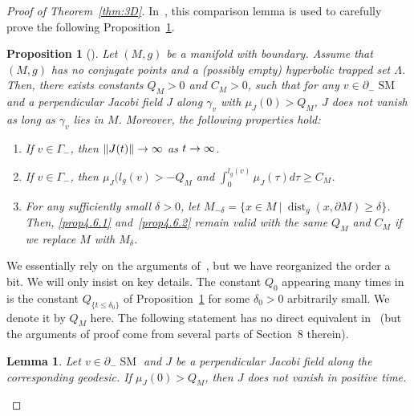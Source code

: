 \documentclass[10pt]{amsart}
\newtheorem{lemm}[theo]{Lemma}\newtheorem{prop}[theo]{Proposition}\newtheorem{coro}[theo]{Corollary}\newtheorem{conj}[theo]{Conjecture}
\theoremstyle{definition}\newtheorem{defi}[theo]{Definition}\newtheorem{rema}[theo]{Remark}\newtheorem{exam}[theo]{Example}\newtheorem{exem}[theo]{Example}\newtheorem{nota}[theo]{Notation}
\DeclareMathOperator{\dist}{dist}
\DeclareMathOperator{\SM}{SM}
\theoremstyle{plain}
\renewcommand*{\to}{\mathchoice{\longrightarrow}{\rightarrow}{\rightarrow}{\rightarrow}}
\begin{document}
\begin{proof}[Proof of Theorem~\ref{thm:3D}]
In~\cite[Section~4]{Chen-Erchenko-Gogolev}, this comparison lemma is used to carefully prove the following Proposition~\ref{prop:4.1}.

\begin{prop}[{\cite[Proposition~4.1]{Chen-Erchenko-Gogolev}}]
\label{prop:4.1}
Let $(M, g)$ be a manifold with boundary. Assume that $(M, g)$ has no conjugate points and a (possibly empty) hyperbolic trapped set $\Lambda$. Then, there exists constants $Q_M > 0$ and $C_M > 0$, such that for any $v \in \partial_- \SM$ and a perpendicular Jacobi field $J$ along $\gamma_v$ with $\mu_J (0) > Q_M$, $J$ does not vanish as long as $\gamma_v$ lies in $M$. Moreover, the following properties hold:
\begin{enumerate}
\item\label{prop4.6.1} If $v \in \Gamma_-$, then $\| J(t)\|\to \infty$ as $t\to\infty$.
\item\label{prop4.6.2} If $v\in \Gamma_-$, then $\mu_J(l_g(v)>-Q_M$ and $\int_0^{l_g(v)} \mu_J(\tau)d\tau \geq C_M$.
\item\label{prop4.6.3} For any sufficiently small $\delta>0$, let $M_{-\delta}=\{x\in M\ |\ \dist_g(x,\partial M)\geq \delta\}$. Then, \eqref{prop4.6.1} and~\eqref{prop4.6.2} remain valid with the same $Q_M$ and $C_M$ if we replace $M$ with $M_\delta$.
\end{enumerate}
\end{prop}

We essentially rely on the arguments of~\cite[Section~8]{Chen-Erchenko-Gogolev}, but we have reorganized the order a bit. We will only insist on key details. The constant $Q_0$ appearing many times in~\cite[Section~8]{Chen-Erchenko-Gogolev} is the constant $Q_{\{t\leq \delta_0\}}$ of Proposition~\ref{prop:4.1} for some $\delta_0>0$ arbitrarily small. We denote it by $Q_M$ here. The following statement has no direct equivalent in~\cite{Chen-Erchenko-Gogolev} (but the arguments of proof come from several parts of Section~8 therein).

\begin{lemm}\label{lemma:our-lemma}
Let $v\in \partial_- \SM$ and $J$ be a perpendicular Jacobi field along the corresponding geodesic. If $\mu_J(0)>Q_M$, then $J$ does not vanish in positive time.
\end{lemm}



\end{proof}
\end{document}
